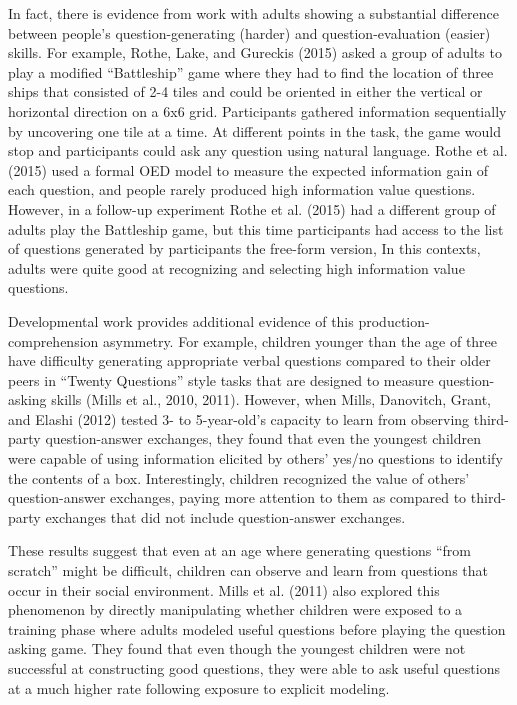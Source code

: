\documentclass[english,floatsintext,man]{apa6}
\theoremstyle{definition}
\theoremstyle{definition}
\theoremstyle{definition}
\theoremstyle{remark}
\begin{document}
In fact, there is evidence from work with adults showing a substantial
difference between people's question-generating (harder) and
question-evaluation (easier) skills. For example, Rothe, Lake, and
Gureckis (2015) asked a group of adults to play a modified
\enquote{Battleship} game where they had to find the location of three
ships that consisted of 2-4 tiles and could be oriented in either the
vertical or horizontal direction on a 6x6 grid. Participants gathered
information sequentially by uncovering one tile at a time. At different
points in the task, the game would stop and participants could ask any
question using natural language. Rothe et al. (2015) used a formal OED
model to measure the expected information gain of each question, and
people rarely produced high information value questions. However, in a
follow-up experiment Rothe et al. (2015) had a different group of adults
play the Battleship game, but this time participants had access to the
list of questions generated by participants the free-form version, In
this contexts, adults were quite good at recognizing and selecting high
information value questions.

Developmental work provides additional evidence of this
production-comprehension asymmetry. For example, children younger than
the age of three have difficulty generating appropriate verbal questions
compared to their older peers in \enquote{Twenty Questions} style tasks
that are designed to measure question-asking skills (Mills et al., 2010,
2011). However, when Mills, Danovitch, Grant, and Elashi (2012) tested
3- to 5-year-old's capacity to learn from observing third-party
question-answer exchanges, they found that even the youngest children
were capable of using information elicited by others' yes/no questions
to identify the contents of a box. Interestingly, children recognized
the value of others' question-answer exchanges, paying more attention to
them as compared to third-party exchanges that did not include
question-answer exchanges.

These results suggest that even at an age where generating questions
\enquote{from scratch} might be difficult, children can observe and
learn from questions that occur in their social environment. Mills et
al. (2011) also explored this phenomenon by directly manipulating
whether children were exposed to a training phase where adults modeled
useful questions before playing the question asking game. They found
that even though the youngest children were not successful at
constructing good questions, they were able to ask useful questions at a
much higher rate following exposure to explicit modeling.
\end{document}
